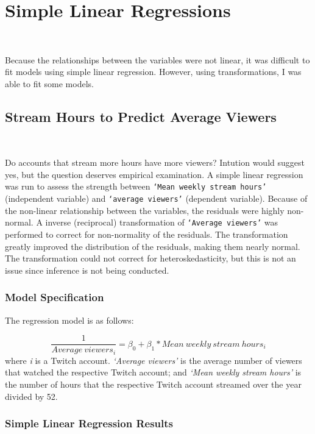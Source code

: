 \documentclass[12pt]{article}
\begin{document}
\section{Simple Linear Regressions}\

Because the relationships between the variables were not linear, it was difficult to fit models using simple linear regression. However, using transformations, I was able to fit some models.

\subsection{Stream Hours to Predict Average Viewers}\

Do accounts that stream more hours have more viewers? Intution would suggest yes, but the question deserves empirical examination. A simple linear regression was run to assess the strength between \texttt{`Mean weekly stream hours’} (independent variable) and \texttt{`average viewers’} (dependent variable). Because of the non-linear relationship between the variables, the residuals were highly non-normal. A inverse (reciprocal) transformation of \texttt{`Average viewers’} was performed to correct for non-normality of the residuals. The transformation greatly improved the distribution of the residuals, making them nearly normal. The transformation could not correct for heteroskedasticity, but this is not an issue since inference is not being conducted.

\subsubsection{Model Specification}

The regression model is as follows:

\begin{equation}
\dfrac{1}{Average\ viewers_{i}} = \beta_{0} + \beta_{1} \ast Mean\ weekly\ stream\ hours_{i} 
\end{equation}
where \textit{i} is a Twitch account. \textit{`Average viewers'} is the average number of viewers that watched the respective Twitch account; and \textit{`Mean weekly stream hours'} is the number of hours that the respective Twitch account streamed over the year divided by 52.

\subsubsection{Simple Linear Regression Results}\
\end{document}
